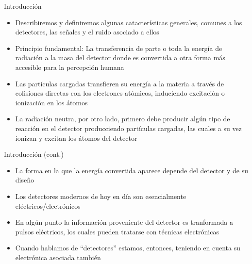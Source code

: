 \documentclass{beamer}
\begin{document}
\begin{frame}
\begin{block}{Introducción}
\begin{itemize}
\item Describiremos y definiremos algunas catacterísticas generales, comunes a los
detectores, las señales y el ruido asociado a ellos
\item Principio fundamental: \alert{La transferencia de parte o toda la energía
de radiación a la masa del detector donde es convertida a otra forma más
accesible para la percepción humana}
\item Las partículas cargadas transfieren su energía a la materia a través de
colisiones directas con los electrones atómicos, induciendo
{\color{blue}excitación} o {\color{blue}ionización} en los átomos
\item La radiación neutra, por otro lado, primero debe producir algún tipo de
reacción en el detector producciendo partículas cargadas, las cuales a su vez
ionizan y excitan los átomos del detector
\end{itemize}
\end{block}
\end{frame} 

\begin{frame}
\begin{block}{Introducción (cont.)}
\begin{itemize}
\item La forma en la que la energía convertida aparece {\color{blue}depende del detector y de
su diseño}
\item Los detectores modernos de hoy en día son esencialmente
eléctricos/electrónicos
\item En algún punto la información proveniente del detector es
tranformada a pulsos eléctricos, los cuales pueden tratarse con técnicas
electrónicas
\item Cuando hablamos de ``detectores'' estamos, entonces, teniendo en cuenta su
electrónica asociada también
\end{itemize}
\end{block}
\end{frame} 
\end{document}
